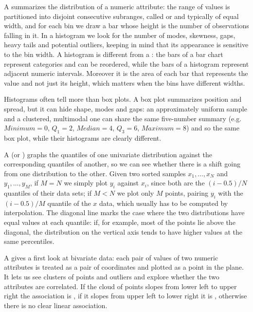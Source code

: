 A  summarizes the distribution of a numeric attribute: the range of values is partitioned into disjoint consecutive subranges, called  or  and typically of equal width, and for each bin we draw a bar whose height is the number of observations falling in it. In a histogram we look for the number of modes, skewness, gaps, heavy tails and potential outliers, keeping in mind that its appearance is sensitive to the bin width. A histogram is different from a : the bars of a bar chart represent categories and can be reordered, while the bars of a histogram represent adjacent numeric intervals. Moreover it is the area of each bar that represents the value and not just its height, which matters when the bins have different widths.

Histograms often tell more than box plots. A box plot summarizes position and spread, but it can hide shape, modes and gaps: an approximately uniform sample and a clustered, multimodal one can share the same five-number summary (e.g. $\mathit{Minimum}=0$, $Q_1=2$, $\mathit{Median}=4$, $Q_3=6$, $\mathit{Maximum}=8$) and so the same box plot, while their histograms are clearly different.

A  (or ) graphs the quantiles of one univariate distribution against the corresponding quantiles of another, so we can see whether there is a shift going from one distribution to the other. Given two sorted samples $x_1,\dots,x_N$ and $y_1,\dots,y_M$, if $M=N$ we simply plot $y_i$ against $x_i$, since both are the $(i-0.5)/N$ quantiles of their data sets; if $M<N$ we plot only $M$ points, pairing $y_i$ with the $(i-0.5)/M$ quantile of the $x$ data, which usually has to be computed by interpolation. The diagonal line marks the case where the two distributions have equal values at each quantile: if, for example, most of the points lie above the diagonal, the distribution on the vertical axis tends to have higher values at the same percentiles.

A  gives a first look at bivariate data: each pair of values of two numeric attributes is treated as a pair of coordinates and plotted as a point in the plane. It lets us see clusters of points and outliers and explore whether the two attributes are correlated. If the cloud of points slopes from lower left to upper right the association is , if it slopes from upper left to lower right it is , otherwise there is no clear linear association.

